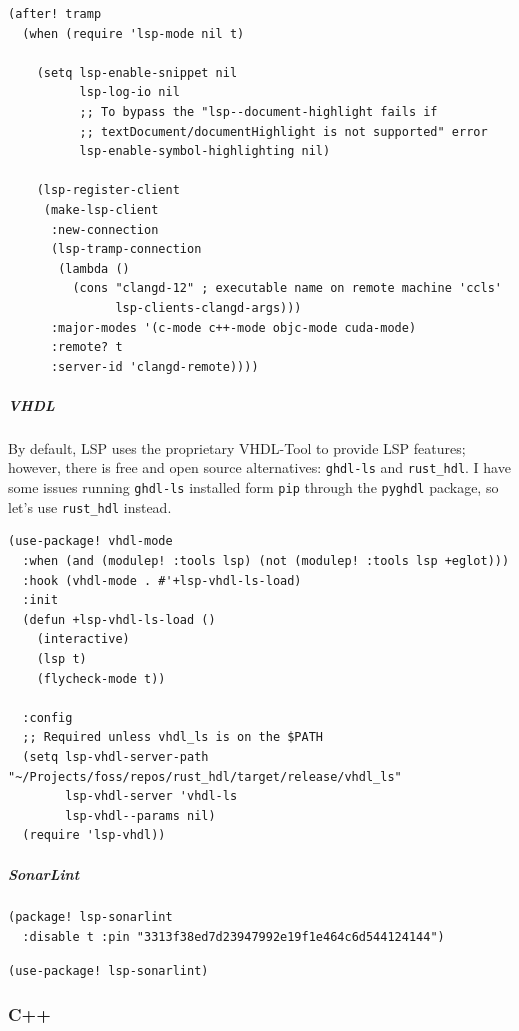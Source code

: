 \documentclass[11pt]{article}
\begin{document}
\begin{enumerate}
\begin{verbatim}
(after! tramp
  (when (require 'lsp-mode nil t)

    (setq lsp-enable-snippet nil
          lsp-log-io nil
          ;; To bypass the "lsp--document-highlight fails if
          ;; textDocument/documentHighlight is not supported" error
          lsp-enable-symbol-highlighting nil)

    (lsp-register-client
     (make-lsp-client
      :new-connection
      (lsp-tramp-connection
       (lambda ()
         (cons "clangd-12" ; executable name on remote machine 'ccls'
               lsp-clients-clangd-args)))
      :major-modes '(c-mode c++-mode objc-mode cuda-mode)
      :remote? t
      :server-id 'clangd-remote))))
\end{verbatim}
\end{enumerate}

\subparagraph{VHDL}
\label{sec:org8e816a3}
By default, LSP uses the proprietary VHDL-Tool to provide LSP features; however,
there is free and open source alternatives: \texttt{ghdl-ls} and \texttt{rust\_hdl}. I have some
issues running \texttt{ghdl-ls} installed form \texttt{pip} through the \texttt{pyghdl} package, so let's
use \texttt{rust\_hdl} instead.

\begin{verbatim}
(use-package! vhdl-mode
  :when (and (modulep! :tools lsp) (not (modulep! :tools lsp +eglot)))
  :hook (vhdl-mode . #'+lsp-vhdl-ls-load)
  :init
  (defun +lsp-vhdl-ls-load ()
    (interactive)
    (lsp t)
    (flycheck-mode t))

  :config
  ;; Required unless vhdl_ls is on the $PATH
  (setq lsp-vhdl-server-path "~/Projects/foss/repos/rust_hdl/target/release/vhdl_ls"
        lsp-vhdl-server 'vhdl-ls
        lsp-vhdl--params nil)
  (require 'lsp-vhdl))
\end{verbatim}

\subparagraph{SonarLint}
\label{sec:orgdc301e8}

\begin{verbatim}
(package! lsp-sonarlint
  :disable t :pin "3313f38ed7d23947992e19f1e464c6d544124144")
\end{verbatim}

\begin{verbatim}
(use-package! lsp-sonarlint)
\end{verbatim}

\subsubsection{C++}
\label{sec:org61ed976}
\end{document}
